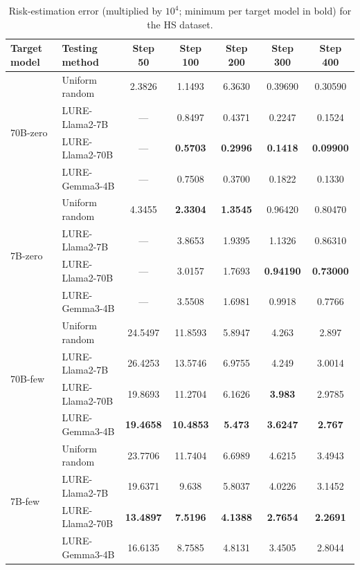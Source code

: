 \begin{table}[h]
    \centering
    \small
    \begin{tabular}{l l c c c c c}
        \toprule
        Target model & Testing method & Step 50 & Step 100 & Step 200 & Step 300 & Step 400 \\
        \midrule
        \multirow{4}{*}{70B-zero}& Uniform random & 2.3826  &  1.1493  &  6.3630  &  0.39690   & 0.30590 \\
        &LURE-Llama2-7B& --- & 0.8497   & 0.4371   & 0.2247  &  0.1524 \\
        &LURE-Llama2-70B & --- & \textbf{0.5703 }  & \textbf{0.2996}  & \textbf{ 0.1418 } & \textbf{ 0.09900 } \\
        &LURE-Gemma3-4B & --- & 0.7508& 0.3700& 0.1822& 0.1330\\
        \hline
        \multirow{4}{*}{7B-zero}& Uniform random& 4.3455  &  \textbf{2.3304}   & \textbf{1.3545}  &  0.96420  &  0.80470 \\
        & LURE-Llama2-7B & --- &3.8653  & 1.9395  &  1.1326  &  0.86310 \\
        & LURE-Llama2-70B &---& 3.0157  & {1.7693}  &  \textbf{0.94190}  & \textbf{ 0.73000} \\
        &LURE-Gemma3-4B & --- & 3.5508& 1.6981& 0.9918& 0.7766\\
        \hline
        \multirow{4}{*}{70B-few}& Uniform random & 24.5497 &  11.8593  &  5.8947 &   4.263 &    2.897 \\
        &LURE-Llama2-7B &  26.4253 &  13.5746 &   6.9755 &   4.249  &   3.0014 \\
        & LURE-Llama2-70B &  19.8693  & 11.2704  &  6.1626 &   \textbf{3.983} &    2.9785 \\
        &LURE-Gemma3-4B & \textbf{19.4658}& \textbf{10.4853}& \textbf{5.473}& \textbf{3.6247} & \textbf{2.767}\\
        \hline
        \multirow{4}{*}{7B-few}& Uniform random & 23.7706  & 11.7404  &  6.6989  &  4.6215 &   3.4943 \\
        &LURE-Llama2-7B &19.6371 &   9.638 &    5.8037 &   4.0226 &3.1452 \\
        &LURE-Llama2-70B & \textbf{13.4897} &   \textbf{7.5196} &   \textbf{4.1388}  &  \textbf{2.7654}&  \textbf{2.2691} \\  
        &LURE-Gemma3-4B & 16.6135& 8.7585& 4.8131& 3.4505 & 2.8044\\
        \hline      
    \end{tabular}
    \vspace{1em}
    \caption{
        Risk-estimation error (multiplied by $10^4$; minimum per target model in bold) for the HS dataset.
    }
    \label{tab:4}
\end{table}


